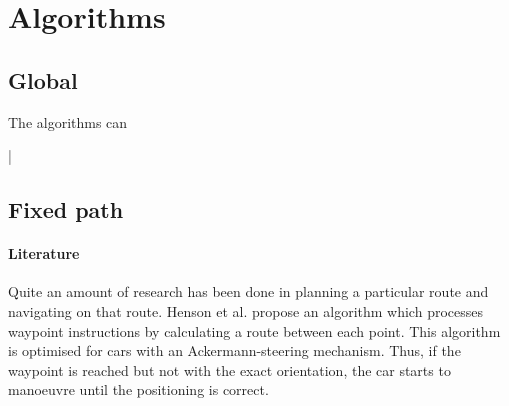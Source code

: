 \documentclass[conference,a4paper]{IEEEtran}
\begin{document}
\section{Algorithms}
\subsection{Global}
The algorithms can 

\newpage
|
\newpage

\subsection{Fixed path}



\paragraph{Literature} Quite an amount of research has been done in planning a particular route and navigating on that route. Henson et al. \cite{Henson2008} propose an algorithm which processes waypoint instructions by calculating a route between each point. This algorithm is optimised for cars with an Ackermann-steering mechanism. Thus, if the waypoint is reached but not with the exact orientation, the car starts to manoeuvre until the positioning is correct. 
\end{document}
